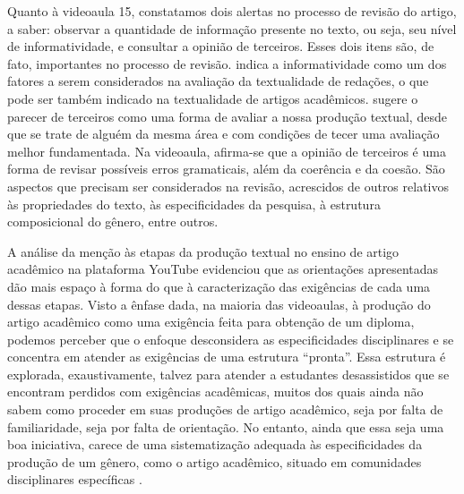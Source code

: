 Quanto à videoaula 15, constatamos dois alertas no processo de revisão
do artigo, a saber: observar a quantidade de informação presente no
texto, ou seja, seu nível de informatividade, e consultar a opinião de
terceiros. Esses dois itens são, de fato, importantes no processo de
revisão. \textcite{costaval1991} indica a informatividade como um dos fatores a
serem considerados na avaliação da textualidade de redações, o que pode
ser também indicado na textualidade de artigos acadêmicos. \textcite{garcez2020}
sugere o parecer de terceiros como uma forma de avaliar a nossa produção
textual, desde que se trate de alguém da mesma área e com condições de
tecer uma avaliação melhor fundamentada. Na videoaula, afirma-se que a
opinião de terceiros é uma forma de revisar possíveis erros gramaticais,
além da coerência e da coesão. São aspectos que precisam ser
considerados na revisão, acrescidos de outros relativos às propriedades
do texto, às especificidades da pesquisa, à estrutura composicional do
gênero, entre outros.

A análise da menção às etapas da produção textual \cite{antunes2003} no
ensino de artigo acadêmico na plataforma YouTube evidenciou que as
orientações apresentadas dão mais espaço à forma do que à caracterização
das exigências de cada uma dessas etapas. Visto a ênfase dada, na
maioria das videoaulas, à produção do artigo acadêmico como uma
exigência feita para obtenção de um diploma, podemos perceber que o
enfoque desconsidera as especificidades disciplinares e se concentra em
atender as exigências de uma estrutura ``pronta''. Essa estrutura é
explorada, exaustivamente, talvez para atender a estudantes
desassistidos que se encontram perdidos com exigências acadêmicas,
muitos dos quais ainda não sabem como proceder em suas produções de
artigo acadêmico, seja por falta de familiaridade, seja por falta de
orientação. No entanto, ainda que essa seja uma boa iniciativa, carece
de uma sistematização adequada às especificidades da produção de um
gênero, como o artigo acadêmico, situado em comunidades disciplinares
específicas \cite{motta-roth2010}.

